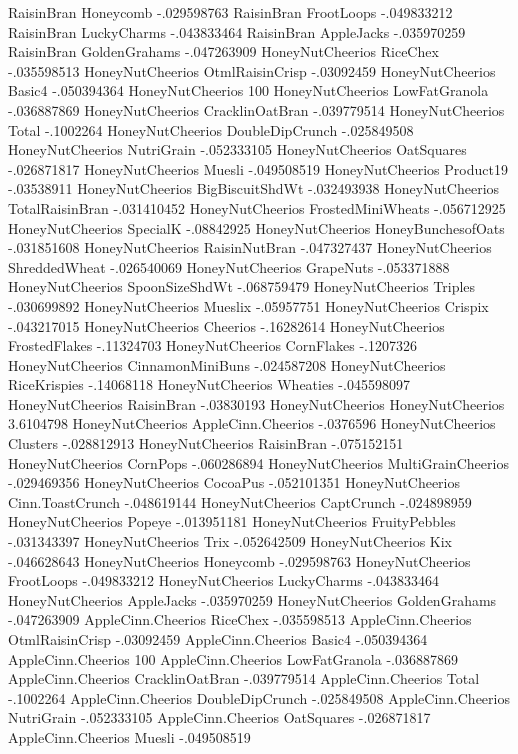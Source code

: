 RaisinBran	Honeycomb	-.029598763
RaisinBran	FrootLoops	-.049833212
RaisinBran	LuckyCharms	-.043833464
RaisinBran	AppleJacks	-.035970259
RaisinBran	GoldenGrahams	-.047263909
HoneyNutCheerios	RiceChex	-.035598513
HoneyNutCheerios	OtmlRaisinCrisp	-.03092459
HoneyNutCheerios	Basic4	-.050394364
HoneyNutCheerios	100%
HoneyNutCheerios	LowFatGranola	-.036887869
HoneyNutCheerios	CracklinOatBran	-.039779514
HoneyNutCheerios	Total	-.1002264
HoneyNutCheerios	DoubleDipCrunch	-.025849508
HoneyNutCheerios	NutriGrain	-.052333105
HoneyNutCheerios	OatSquares	-.026871817
HoneyNutCheerios	Muesli	-.049508519
HoneyNutCheerios	Product19	-.03538911
HoneyNutCheerios	BigBiscuitShdWt	-.032493938
HoneyNutCheerios	TotalRaisinBran	-.031410452
HoneyNutCheerios	FrostedMiniWheats	-.056712925
HoneyNutCheerios	SpecialK	-.08842925
HoneyNutCheerios	HoneyBunchesofOats	-.031851608
HoneyNutCheerios	RaisinNutBran	-.047327437
HoneyNutCheerios	ShreddedWheat	-.026540069
HoneyNutCheerios	GrapeNuts	-.053371888
HoneyNutCheerios	SpoonSizeShdWt	-.068759479
HoneyNutCheerios	Triples	-.030699892
HoneyNutCheerios	Mueslix	-.05957751
HoneyNutCheerios	Crispix	-.043217015
HoneyNutCheerios	Cheerios	-.16282614
HoneyNutCheerios	FrostedFlakes	-.11324703
HoneyNutCheerios	CornFlakes	-.1207326
HoneyNutCheerios	CinnamonMiniBuns	-.024587208
HoneyNutCheerios	RiceKrispies	-.14068118
HoneyNutCheerios	Wheaties	-.045598097
HoneyNutCheerios	RaisinBran	-.03830193
HoneyNutCheerios	HoneyNutCheerios	3.6104798
HoneyNutCheerios	AppleCinn.Cheerios	-.0376596
HoneyNutCheerios	Clusters	-.028812913
HoneyNutCheerios	RaisinBran	-.075152151
HoneyNutCheerios	CornPops	-.060286894
HoneyNutCheerios	MultiGrainCheerios	-.029469356
HoneyNutCheerios	CocoaPus	-.052101351
HoneyNutCheerios	Cinn.ToastCrunch	-.048619144
HoneyNutCheerios	CaptCrunch	-.024898959
HoneyNutCheerios	Popeye	-.013951181
HoneyNutCheerios	FruityPebbles	-.031343397
HoneyNutCheerios	Trix	-.052642509
HoneyNutCheerios	Kix	-.046628643
HoneyNutCheerios	Honeycomb	-.029598763
HoneyNutCheerios	FrootLoops	-.049833212
HoneyNutCheerios	LuckyCharms	-.043833464
HoneyNutCheerios	AppleJacks	-.035970259
HoneyNutCheerios	GoldenGrahams	-.047263909
AppleCinn.Cheerios	RiceChex	-.035598513
AppleCinn.Cheerios	OtmlRaisinCrisp	-.03092459
AppleCinn.Cheerios	Basic4	-.050394364
AppleCinn.Cheerios	100%
AppleCinn.Cheerios	LowFatGranola	-.036887869
AppleCinn.Cheerios	CracklinOatBran	-.039779514
AppleCinn.Cheerios	Total	-.1002264
AppleCinn.Cheerios	DoubleDipCrunch	-.025849508
AppleCinn.Cheerios	NutriGrain	-.052333105
AppleCinn.Cheerios	OatSquares	-.026871817
AppleCinn.Cheerios	Muesli	-.049508519
